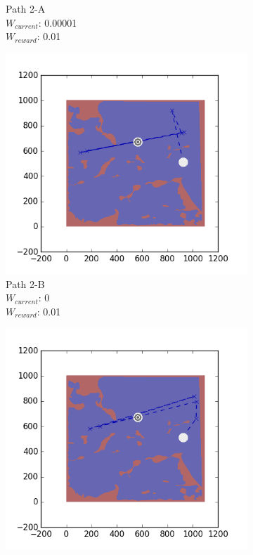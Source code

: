 \documentclass{tamuccthesis}
\begin{document}
\begin{figure}[H]
\begin{subfigure}[b]{0.24\textwidth}
        \caption{{\small Path 2-A \\ $W_{current}$: 0.00001 \\ $W_{reward}$: 0.01}}   
        \label{fig:Path_2-A_upReward_Work}
    \end{subfigure}
  \begin{subfigure}[b]{0.24\textwidth}
        \centering
        \includegraphics[width=\textwidth,trim={4cm 3cm 2cm 3cm},clip]{EXP3RG_PathBb_-1_-1_0_0d01.png}
        \caption{{\small Path 2-B \\ $W_{current}$: 0 \\ $W_{reward}$: 0.01}}    
        \label{fig:Path_2-B_upReward_noWork}
    \end{subfigure}
    \begin{subfigure}[b]{0.24\textwidth}  
        \centering 
        \includegraphics[width=\textwidth,trim={4cm 3cm 2cm 3cm},clip]{EXP3RG_PathBb_-1_-1_-1_0d01.png}

\end{subfigure}
\end{figure}
\end{document}
